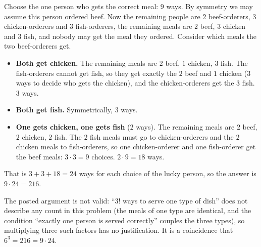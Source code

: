 Choose the one person who gets the correct meal: $9$ ways. By symmetry we may assume this person ordered beef. Now the remaining people are $2$ beef-orderers, $3$ chicken-orderers and $3$ fish-orderers, the remaining meals are $2$ beef, $3$ chicken and $3$ fish, and nobody may get the meal they ordered. Consider which meals the two beef-orderers get.
\begin{itemize}
\item \textbf{Both get chicken.} The remaining meals are $2$ beef, $1$ chicken, $3$ fish. The fish-orderers cannot get fish, so they get exactly the $2$ beef and $1$ chicken ($3$ ways to decide who gets the chicken), and the chicken-orderers get the $3$ fish. $3$ ways.
\item \textbf{Both get fish.} Symmetrically, $3$ ways.
\item \textbf{One gets chicken, one gets fish} ($2$ ways). The remaining meals are $2$ beef, $2$ chicken, $2$ fish. The $2$ fish meals must go to chicken-orderers and the $2$ chicken meals to fish-orderers, so one chicken-orderer and one fish-orderer get the beef meals: $3\cdot3=9$ choices. $2\cdot9=18$ ways.
\end{itemize}
That is $3+3+18=24$ ways for each choice of the lucky person, so the answer is $9\cdot24=\boxed{216}$.

The posted argument is not valid: ``$3!$ ways to serve one type of dish'' does not describe any count in this problem (the meals of one type are identical, and the condition ``exactly one person is served correctly'' couples the three types), so multiplying three such factors has no justification. It is a coincidence that $6^3=216=9\cdot24$.
